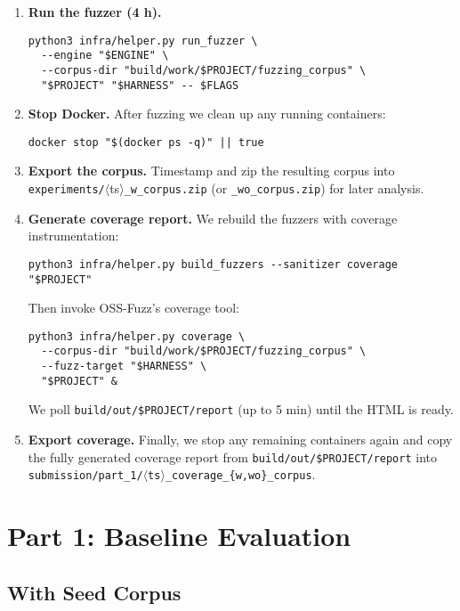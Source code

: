 \documentclass[11pt,a4paper,twocolumn]{article}
\begin{document}
\begin{enumerate}
	\item \textbf{Run the fuzzer (4 h).}
	      \begin{verbatim}
python3 infra/helper.py run_fuzzer \
  --engine "$ENGINE" \
  --corpus-dir "build/work/$PROJECT/fuzzing_corpus" \
  "$PROJECT" "$HARNESS" -- $FLAGS
    \end{verbatim}

	\item \textbf{Stop Docker.}
	      After fuzzing we clean up any running containers:
	      \begin{verbatim}
docker stop "$(docker ps -q)" || true
    \end{verbatim}

	\item \textbf{Export the corpus.}
	      Timestamp and zip the resulting corpus into \texttt{experiments/}\(\langle\)ts\(\rangle\)\texttt{\_w\_corpus.zip} (or \texttt{\_wo\_corpus.zip}) for later analysis.

	\item \textbf{Generate coverage report.}
	      We rebuild the fuzzers with coverage instrumentation:
	      \begin{verbatim}
python3 infra/helper.py build_fuzzers --sanitizer coverage "$PROJECT"
    \end{verbatim}
	      Then invoke OSS-Fuzz’s coverage tool:
	      \begin{verbatim}
python3 infra/helper.py coverage \
  --corpus-dir "build/work/$PROJECT/fuzzing_corpus" \
  --fuzz-target "$HARNESS" \
  "$PROJECT" &
    \end{verbatim}
	      We poll \texttt{build/out/\$PROJECT/report} (up to 5 min) until the HTML is ready.

	\item \textbf{Export coverage.}
	      Finally, we stop any remaining containers again and copy the fully generated
	      coverage report from \texttt{build/out/\$PROJECT/report} into
	      \texttt{submission/part\_1/\(\langle\)ts\(\rangle\)\_coverage\_{\{w,wo\}\_corpus}}.
\end{enumerate}

\section{Part 1: Baseline Evaluation}

\subsection{With Seed Corpus}
\end{document}
